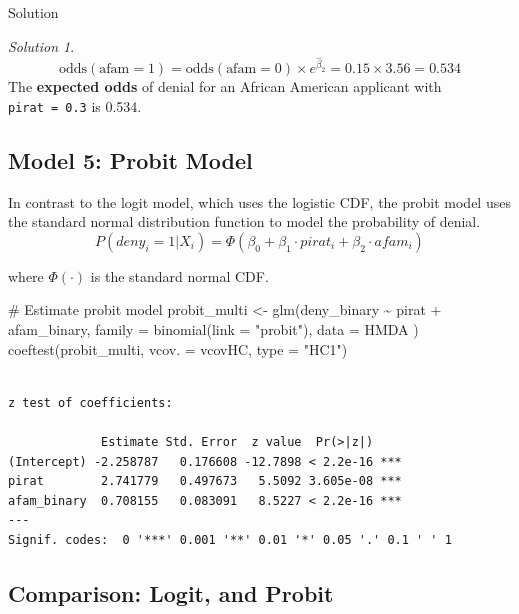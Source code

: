 \documentclass[
  12pt,
  letterpaper,
]{scrbook}
\newenvironment{Shaded}{\begin{snugshade}}{\end{snugshade}}
\newcommand{\AttributeTok}[1]{\textcolor[rgb]{0.40,0.45,0.13}{#1}}
\newcommand{\CommentTok}[1]{\textcolor[rgb]{0.37,0.37,0.37}{#1}}
\newcommand{\FunctionTok}[1]{\textcolor[rgb]{0.28,0.35,0.67}{#1}}
\newcommand{\NormalTok}[1]{\textcolor[rgb]{0.00,0.23,0.31}{#1}}
\newcommand{\OtherTok}[1]{\textcolor[rgb]{0.00,0.23,0.31}{#1}}
\newcommand{\SpecialCharTok}[1]{\textcolor[rgb]{0.37,0.37,0.37}{#1}}
\newcommand{\StringTok}[1]{\textcolor[rgb]{0.13,0.47,0.30}{#1}}
\theoremstyle{definition}
\theoremstyle{plain}
\theoremstyle{remark}
\newtheorem{refsolution}{Solution}[chapter]
\begin{document}
Solution

\begin{refsolution}
\[
\text{odds}(\text{afam}=1) = \text{odds}(\text{afam}=0) \times e^{\hat{\beta}_2} = 0.15 \times 3.56 = 0.534
\] The \textbf{expected odds} of denial for an African American
applicant with \texttt{pirat\ =\ 0.3} is 0.534.

\label{sol-2}

\end{refsolution}

\subsection{Model 5: Probit Model}\label{model-5-probit-model}

In contrast to the logit model, which uses the logistic CDF, the probit
model uses the {standard normal} distribution function to model the
probability of denial. \[
P(deny_i = 1 | X_i) = \Phi(\beta_0 + \beta_1 \cdot pirat_i + \beta_2 \cdot afam_i)
\]

where \(\Phi(\cdot)\) is the standard normal CDF.

\begin{Shaded}
\begin{Highlighting}[]
\CommentTok{\# Estimate probit model}
\NormalTok{probit\_multi }\OtherTok{\textless{}{-}} \FunctionTok{glm}\NormalTok{(deny\_binary }\SpecialCharTok{\textasciitilde{}}\NormalTok{ pirat }\SpecialCharTok{+}\NormalTok{ afam\_binary,}
    \AttributeTok{family =} \FunctionTok{binomial}\NormalTok{(}\AttributeTok{link =} \StringTok{"probit"}\NormalTok{),}
    \AttributeTok{data =}\NormalTok{ HMDA}
\NormalTok{)}
\FunctionTok{coeftest}\NormalTok{(probit\_multi, }\AttributeTok{vcov. =}\NormalTok{ vcovHC, }\AttributeTok{type =} \StringTok{"HC1"}\NormalTok{)}
\end{Highlighting}
\end{Shaded}

\begin{verbatim}

z test of coefficients:

             Estimate Std. Error  z value  Pr(>|z|)    
(Intercept) -2.258787   0.176608 -12.7898 < 2.2e-16 ***
pirat        2.741779   0.497673   5.5092 3.605e-08 ***
afam_binary  0.708155   0.083091   8.5227 < 2.2e-16 ***
---
Signif. codes:  0 '***' 0.001 '**' 0.01 '*' 0.05 '.' 0.1 ' ' 1
\end{verbatim}

\subsection{Comparison: Logit, and
Probit}\label{comparison-logit-and-probit}
\end{document}
